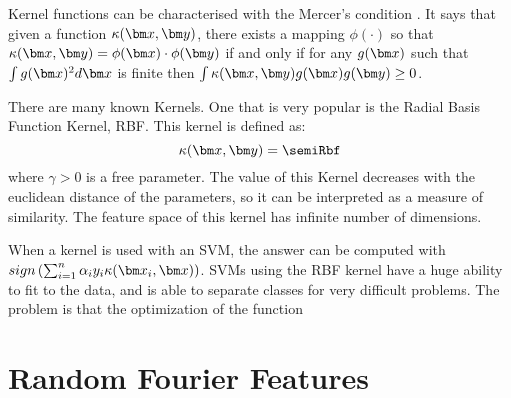 \begin{pre-delivery}
Kernel functions can be characterised with the Mercer's condition
\cite{mercer1909functions}. It says that given a function $\kernel(\vx, \vy)$,
there exists a mapping $\phi(\cdot)$ so that
$\kernel(\vx, \vy) = \phi(\vx)\cdot\phi(\vy)$
if and only if for any $g(\vx)$ such that $\int g(\vx)^2 d\vx$ is finite then
$\int \kernel(\vx, \vy)g(\vx)g(\vy) \geq 0$.

There are many known Kernels. One that is very popular is the Radial Basis
Function Kernel\cite{vert2004primer}, RBF. This kernel is defined as:
\begin{equation}
\kernel(\vx,\vy) = \semiRbf
\end{equation}
where $\gamma > 0$ is a free parameter. The value of this Kernel decreases with the
euclidean distance of the parameters, so it can be interpreted as a measure
of similarity. The feature space of this kernel has infinite number of
dimensions.

When a kernel is used with an SVM, the answer can be computed with
$sign\left(\sum_{i = 1}^n \alpha_iy_i\kernel(\vx_i, \vx)\right)$.
SVMs using the RBF kernel have a huge ability to fit to the data, and is able
to separate classes for very difficult problems. The problem is that the
optimization of the function

\end{pre-delivery}

\section{Random Fourier Features}


